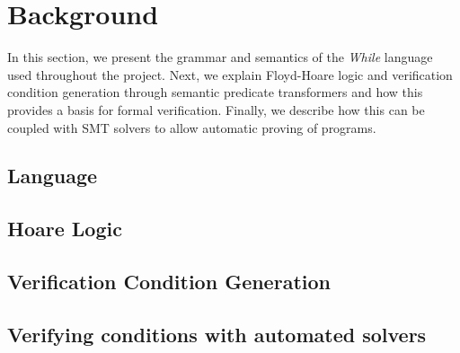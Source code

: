 \section{Background}\label{sec:Background}
In this section, we present the grammar and semantics of the \textit{While} language used throughout the project.
Next, we explain Floyd-Hoare logic and verification condition generation through semantic predicate transformers and how this provides a basis for formal verification.
Finally, we describe how this can be coupled with SMT solvers to allow automatic proving of programs.

\subsection{Language}\label{sec:Language}


\subsection{Hoare Logic}\label{sec:hoare}


\subsection{Verification Condition Generation}\label{sec:vcg}


\subsection{Verifying conditions with automated solvers}

